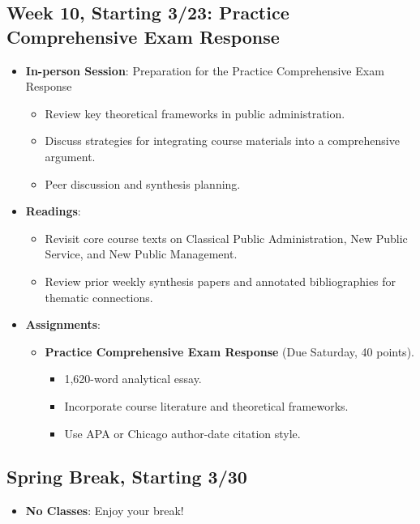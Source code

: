 \documentclass[12pt, letterpaper]{article}
\begin{document}
\subsection*{Week 10, Starting 3/23: Practice Comprehensive Exam Response}
\begin{itemize}
    \item \textbf{In-person Session}: Preparation for the Practice Comprehensive Exam Response
    \begin{itemize}
        \item Review key theoretical frameworks in public administration.
        \item Discuss strategies for integrating course materials into a comprehensive argument.
        \item Peer discussion and synthesis planning.
    \end{itemize}
    \item \textbf{Readings}: 
    \begin{itemize}
        \item Revisit core course texts on Classical Public Administration, New Public Service, and New Public Management.
        \item Review prior weekly synthesis papers and annotated bibliographies for thematic connections.
    \end{itemize}
    \item \textbf{Assignments}:
    \begin{itemize}
        \item \textbf{Practice Comprehensive Exam Response} (Due Saturday, 40 points).
        \begin{itemize}
            \item 1,620-word analytical essay.
            \item Incorporate course literature and theoretical frameworks.
            \item Use APA or Chicago author-date citation style.
        \end{itemize}
    \end{itemize}
\end{itemize}


\subsection*{Spring Break, Starting 3/30}
\begin{itemize}
    \item \textbf{No Classes}: Enjoy your break!
\end{itemize}
\end{document}

